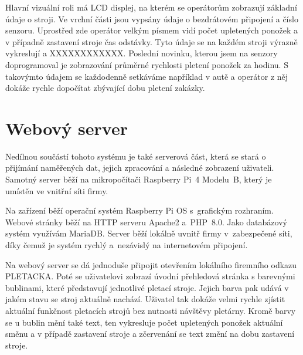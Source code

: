 \documentclass{template/socthesis}
\begin{document}
Hlavní vizuální roli má LCD displej, na kterém se operátorům zobrazují základní údaje o stroji.
Ve vrchní části jsou vypsány údaje o bezdrátovém připojení a číslo senzoru.
Uprostřed zde operátor velkým písmem vidí počet upletených ponožek a v případně zastavení stroje čas odstávky.
Tyto údaje se na každém stroji výrazně vykreslují a XXXXXXXXXXXX.
Poslední novinku, kterou jsem na senzory doprogramoval je zobrazování průměrné rychlosti pletení ponožek za hodinu.
S takovýmto údajem se každodenně setkáváme například v autě a operátor z něj dokáže rychle dopočítat zbývající dobu pletení zakázky. 



\section{Webový server}

Nedílnou součástí tohoto systému je také serverová část, která se stará o přijímání naměřených dat, jejich zpracování a následné zobrazení uživateli.
Samotný server běží na mikropočítači Raspberry Pi~4 Modelu~B, který je umístěn ve vnitřní síti firmy.

Na zařízení běží operační systém Raspberry Pi OS s~grafickým rozhraním.
Webové stránky běží na HTTP serveru Apache2 a~PHP~8.0.
Jako databázový systém využívám MariaDB.
Server běží lokálně uvnitř firmy v~zabezpečené síti, díky čemuž je systém rychlý a~nezávislý na internetovém připojení.

Na webový server se dá jednoduše připojit otevřením lokálního firemního odkazu PLETACKA.
Poté se uživatelovi zobrazí úvodní přehledová stránka s barevnými bublinami, které představují jednotlivé pletací stroje.
Jejich barva pak udává v jakém stavu se stroj aktuálně nachází. Uživatel tak dokáže velmi rychle zjístit aktuální funkčnost pletacích strojů bez nutnosti návštěvy pletárny.
Kromě barvy se u bublin mění také text, ten vykresluje počet upletených ponožek aktuální směnu a v případě zastavení stroje a zčervenání se text změní na dobu zastavení stroje.
\end{document}
